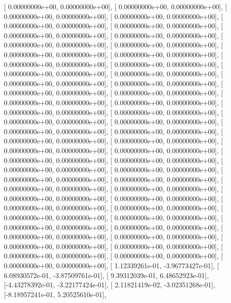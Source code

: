 \documentclass{article}
\begin{document}
       [ 0.00000000e+00,  0.00000000e+00],
       [ 0.00000000e+00,  0.00000000e+00],
       [ 0.00000000e+00,  0.00000000e+00],
       [ 0.00000000e+00,  0.00000000e+00],
       [ 0.00000000e+00,  0.00000000e+00],
       [ 0.00000000e+00,  0.00000000e+00],
       [ 0.00000000e+00,  0.00000000e+00],
       [ 0.00000000e+00,  0.00000000e+00],
       [ 0.00000000e+00,  0.00000000e+00],
       [ 0.00000000e+00,  0.00000000e+00],
       [ 0.00000000e+00,  0.00000000e+00],
       [ 0.00000000e+00,  0.00000000e+00],
       [ 0.00000000e+00,  0.00000000e+00],
       [ 0.00000000e+00,  0.00000000e+00],
       [ 0.00000000e+00,  0.00000000e+00],
       [ 0.00000000e+00,  0.00000000e+00],
       [ 0.00000000e+00,  0.00000000e+00],
       [ 0.00000000e+00,  0.00000000e+00],
       [ 0.00000000e+00,  0.00000000e+00],
       [ 0.00000000e+00,  0.00000000e+00],
       [ 0.00000000e+00,  0.00000000e+00],
       [ 0.00000000e+00,  0.00000000e+00],
       [ 0.00000000e+00,  0.00000000e+00],
       [ 0.00000000e+00,  0.00000000e+00],
       [ 0.00000000e+00,  0.00000000e+00],
       [ 0.00000000e+00,  0.00000000e+00],
       [ 0.00000000e+00,  0.00000000e+00],
       [ 0.00000000e+00,  0.00000000e+00],
       [ 0.00000000e+00,  0.00000000e+00],
       [ 0.00000000e+00,  0.00000000e+00],
       [ 0.00000000e+00,  0.00000000e+00],
       [ 0.00000000e+00,  0.00000000e+00],
       [ 0.00000000e+00,  0.00000000e+00],
       [ 0.00000000e+00,  0.00000000e+00],
       [ 0.00000000e+00,  0.00000000e+00],
       [ 0.00000000e+00,  0.00000000e+00],
       [ 0.00000000e+00,  0.00000000e+00],
       [ 0.00000000e+00,  0.00000000e+00],
       [ 0.00000000e+00,  0.00000000e+00],
       [ 0.00000000e+00,  0.00000000e+00],
       [ 0.00000000e+00,  0.00000000e+00],
       [ 0.00000000e+00,  0.00000000e+00],
       [ 0.00000000e+00,  0.00000000e+00],
       [ 0.00000000e+00,  0.00000000e+00],
       [ 0.00000000e+00,  0.00000000e+00],
       [ 0.00000000e+00,  0.00000000e+00],
       [ 0.00000000e+00,  0.00000000e+00],
       [ 0.00000000e+00,  0.00000000e+00],
       [ 0.00000000e+00,  0.00000000e+00],
       [ 0.00000000e+00,  0.00000000e+00],
       [ 0.00000000e+00,  0.00000000e+00],
       [ 0.00000000e+00,  0.00000000e+00],
       [ 0.00000000e+00,  0.00000000e+00],
       [ 0.00000000e+00,  0.00000000e+00],
       [ 0.00000000e+00,  0.00000000e+00],
       [ 1.12339261e-01, -3.96773427e-01],
       [ 6.08930572e-01, -3.87509761e-01],
       [ 9.39312039e-01,  6.48652923e-01],
       [-4.43278392e-01, -3.22177424e-01],
       [ 2.11821419e-02, -3.02351268e-01],
       [-8.18957241e-01,  5.20525610e-01],
\end{document}
